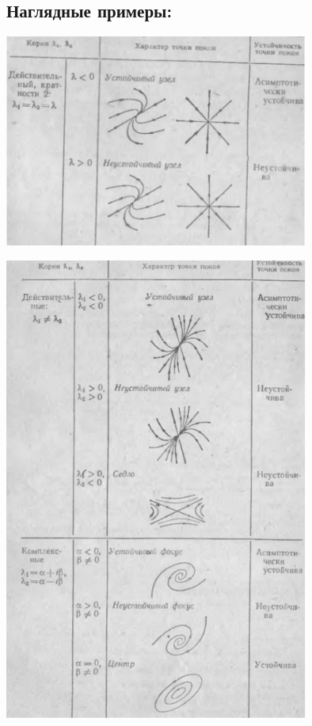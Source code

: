 \documentclass[12pt]{article}
\begin{document}
\subsection{Наглядные примеры:}

\includegraphics[width=100mm]{graphics/31_de_1.png}

\includegraphics[width=100mm]{graphics/31_de_2.png}
\end{document}
